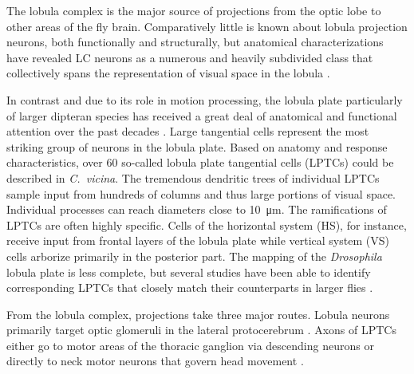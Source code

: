 The lobula complex is the major source of projections from the optic lobe to other areas of the fly brain. Comparatively little is known about lobula projection neurons, both functionally and structurally, but anatomical characterizations have revealed LC neurons as a numerous and heavily subdivided class that collectively spans the representation of visual space in the lobula \citet{Otsuna:2006aa}.

In contrast and due to its role in motion processing, the lobula plate particularly of larger dipteran species has received a great deal of anatomical and functional attention over the past decades \citep[for a thorough review, see][]{Borst:2002iw,Borst:2010fk}. Large tangential cells represent the most striking group of neurons in the lobula plate. Based on anatomy and response characteristics, over 60 so-called lobula plate tangential cells (LPTCs) could be described in \textit{C.\ vicina}. The tremendous dendritic trees of individual LPTCs sample input from hundreds of columns and thus large portions of visual space. Individual processes can reach diameters close to \SI{10}{\micro\meter}. The ramifications of LPTCs are often highly specific. Cells of the horizontal system (HS), for instance, receive input from frontal layers of the lobula plate while vertical system (VS) cells arborize primarily in the posterior part. The mapping of the \textit{Drosophila} lobula plate is less complete, but several studies have been able to identify corresponding LPTCs that closely match their counterparts in larger flies \citep{Fischbach:1989uw,Scott:2002aa,Joesch:2008fo,Schnell:2010ik}.

From the lobula complex, projections take three major routes. Lobula neurons primarily target optic glomeruli in the lateral protocerebrum \citep{Mu:2012aa}. Axons of LPTCs either go to motor areas of the thoracic ganglion via descending neurons or directly to neck motor neurons that govern head movement \citep{Strausfeld:1985aa,Borst:2014kl}.

